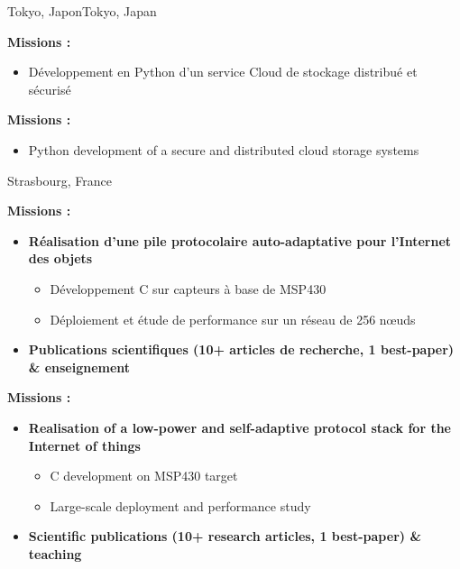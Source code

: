 {}{}{\ifnativelang Tokyo, Japon\else Tokyo, Japan\fi}{
\ifnativelang
	\textcolor{color1}{\textbf{Missions :}}
	\begin{itemize}[leftmargin=\ListItemsMargins]
		\item D\'eveloppement en Python d'un service Cloud de stockage distribu\'e et s\'ecuris\'e
	\end{itemize}
\else
	\textcolor{color1}{\textbf{Missions :}}
	\begin{itemize}[leftmargin=\ListItemsMargins]
		\item Python development of a secure and distributed cloud storage systems
	\end{itemize}
\fi
}

\vspace{\ItemsMaxSpacing}

{}{}{Strasbourg, France}{
\ifnativelang
	\textcolor{color1}{\textbf{Missions :}}
	\begin{itemize}[leftmargin=\ListItemsMargins]
		\item \textbf{R\'ealisation d'une pile protocolaire auto-adaptative pour l'Internet des objets}
		\begin{itemize}
			\item D\'eveloppement C sur capteurs \`a base de MSP430
			\item D\'eploiement et étude de performance sur un r\'eseau de 256 n\oe uds
		\end{itemize}
		\ifaddmngt
		\item \textbf{Publications scientifiques (10+ articles de recherche, 1 best-paper) \& enseignement}
		\fi
	\end{itemize}
\else
	\textcolor{color1}{\textbf{Missions :}}
	\begin{itemize}[leftmargin=\ListItemsMargins]
		\item \textbf{Realisation of a low-power and self-adaptive protocol stack for the Internet of things}
		\begin{itemize}
			\item C development on MSP430 target
			\item Large-scale deployment and performance study
		\end{itemize}
		\item \textbf{Scientific publications (10+ research articles, 1 best-paper) \& teaching}
	\end{itemize}
\fi
}


